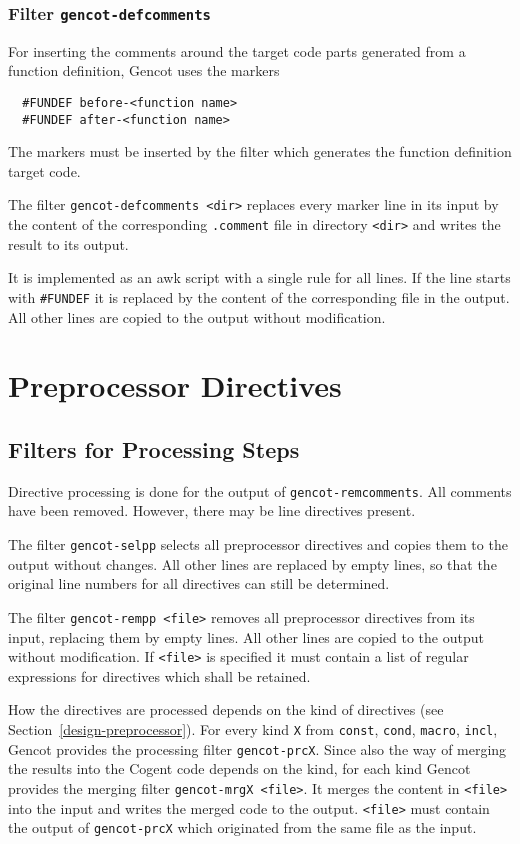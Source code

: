 \documentclass[a4paper]{report}
\newcommand{\code}[1]{\textnormal{\texttt{#1}}}
\begin{document}
\subsubsection{Filter \code{gencot-defcomments}}

For inserting the comments around the target code parts generated from a function definition, Gencot uses the markers
\begin{verbatim}
  #FUNDEF before-<function name>
  #FUNDEF after-<function name>
\end{verbatim}
The markers must be inserted by the filter which generates the function definition target code.

The filter \code{gencot-defcomments <dir>} replaces every marker line in its input by the content of the corresponding
\code{.comment} file in directory \code{<dir>} and writes the result to its output.

It is implemented as an awk script with a single rule for all lines. If the line starts with \code{\#FUNDEF} it is
replaced by the content of the corresponding file in the output. All other lines are copied to the output without 
modification.

\section{Preprocessor Directives}

\subsection{Filters for Processing Steps}

Directive processing is done for the output of \code{gencot-remcomments}. All comments have been removed. 
However, there may be line directives present. 

The filter \code{gencot-selpp} selects all preprocessor directives and
copies them to the output without changes. All other lines are replaced by empty lines, so that the original
line numbers for all directives can still be determined.

The filter \code{gencot-rempp <file>} removes all preprocessor directives from its input, replacing them by empty
lines. All other lines are copied to the output without modification. If \code{<file>} is specified it must 
contain a list of regular expressions for directives which shall be retained.

How the directives are processed depends on the kind of directives (see Section~\ref{design-preprocessor}).
For every kind \code{X} from \code{const}, \code{cond}, \code{macro}, \code{incl}, Gencot provides the processing
filter \code{gencot-prcX}. Since also the way of merging the results into the Cogent code depends on the
kind, for each kind Gencot provides the merging filter \code{gencot-mrgX <file>}. It merges the content in \code{<file>} 
into the input and writes the merged code to the output. \code{<file>} must contain the output of \code{gencot-prcX}
which originated from the same file as the input.
\end{document}
